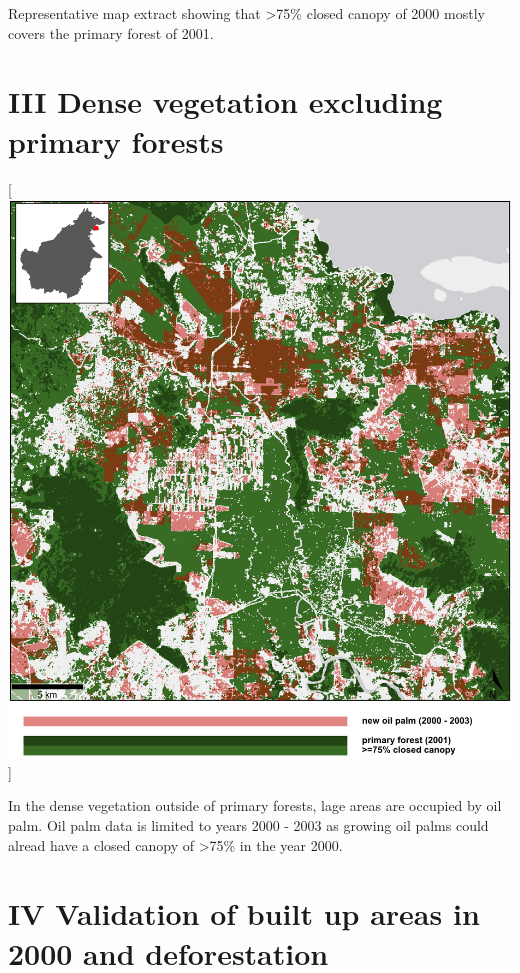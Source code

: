 \documentclass[
  letterpaper,
  DIV=11,
  numbers=noendperiod]{scrreprt}
\begin{document}
Representative map extract showing that \textgreater75\% closed canopy
of 2000 mostly covers the primary forest of 2001. \newpage

\hypertarget{dense-vegetation-excluding-primary-forests}{%
\section*{\texorpdfstring{\textsc{III} Dense vegetation excluding
primary
forests}{ Dense vegetation excluding primary forests}}\label{dense-vegetation-excluding-primary-forests}}


\color{white}

{[}\includegraphics[width=1\textwidth,height=\textheight]{text/../code/results/maps/vegetation_oil_palm_00_03.png}{]}
\normalcolor

In the dense vegetation outside of primary forests, lage areas are
occupied by oil palm. Oil palm data is limited to years 2000 - 2003 as
growing oil palms could alread have a closed canopy of \textgreater75\%
in the year 2000. \newpage

\hypertarget{validation-of-built-up-areas-in-2000-and-deforestation}{%
\section*{\texorpdfstring{\textsc{IV} Validation of built up areas in
2000 and
deforestation}{ Validation of built up areas in 2000 and deforestation}}\label{validation-of-built-up-areas-in-2000-and-deforestation}}
\end{document}
